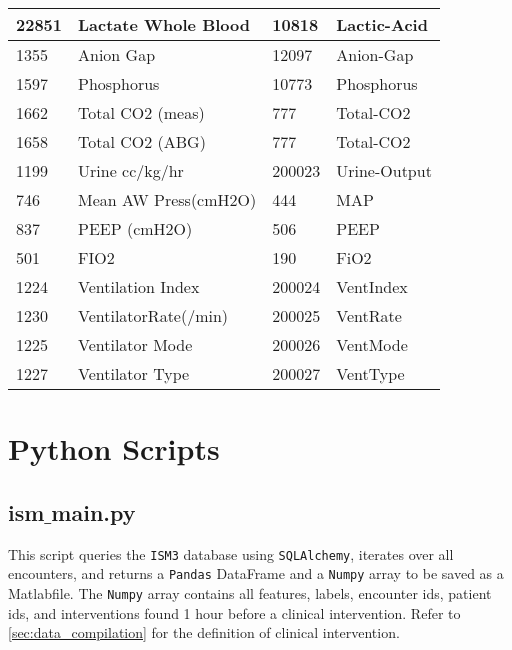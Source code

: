 \documentclass[
   technote
]{phildoc}
\newcommand{\matlab}{Matlab\texttrademark}
\begin{document}
\begin{table}[h!]
\begin{tabular}{l|l|l|l}
	\hline
	22851 & Lactate Whole Blood & 10818 & Lactic-Acid \\
	\hline
	1355 & Anion Gap & 12097 & Anion-Gap \\
	\hline
	1597 & Phosphorus & 10773 & Phosphorus \\
	\hline
	1662 & Total CO2 (meas) & 777 & Total-CO2 \\
	\hline
	1658 & Total CO2 (ABG) & 777 & Total-CO2 \\
	\hline
	1199 & Urine cc/kg/hr & 200023 & Urine-Output \\
	\hline
	746 & Mean AW Press(cmH2O) & 444 & MAP \\
	\hline
	837 & PEEP (cmH2O) & 506 & PEEP \\
	\hline
	501 & FIO2 & 190 & FiO2 \\
	\hline
	1224 & Ventilation Index & 200024 & VentIndex \\
	\hline
	1230 & VentilatorRate(/min) & 200025 & VentRate \\
	\hline
	1225 & Ventilator Mode & 200026 & VentMode \\
	\hline
	1227 & Ventilator Type & 200027 & VentType \\
	\hline
	\hline
\end{tabular}
\end{table} 

\cleardoublepage 
\newpage
\section{Python Scripts}
 

\subsection{ism$\_$main.py}
This script queries the \texttt{ISM3} database using \texttt{SQLAlchemy}, iterates over all encounters, and returns a \texttt{Pandas} DataFrame and a \texttt{Numpy} array to be saved as a \matlab file. The \texttt{Numpy} array contains all features, labels, encounter ids, patient ids, and interventions found 1 hour before a clinical intervention. Refer to \ref{sec:data_compilation} for the definition of clinical intervention. 
\end{document}
